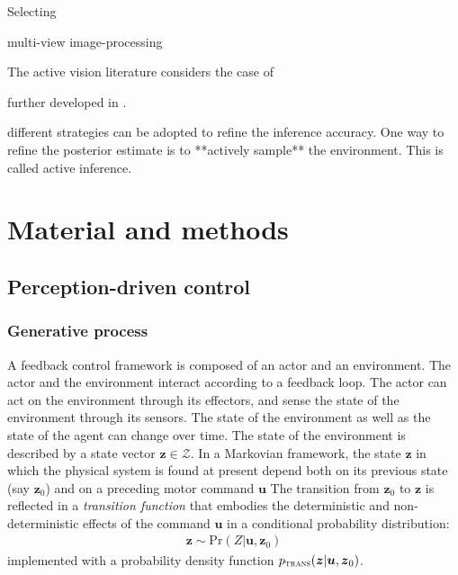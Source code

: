 \documentclass[12pt,twoside,openright]{article}
\begin{document}
Selecting 

multi-view image-processing

The active vision literature considers the case of 




further developed in \cite{najemnik2005optimal,butko2010infomax,ahmad2013active,potthast2016active}.



{ different strategies can be adopted to refine the inference accuracy. One way to refine the posterior estimate is to **actively sample** the environment. This is called active inference.} 



\section{Material and methods}

\subsection{Perception-driven control}

\subsubsection{Generative process}
A feedback control framework is composed of an actor and an environment. The actor and the environment interact according to a feedback loop. 
The actor can act on the environment through its effectors, and sense the state of the environment through its sensors. 
The state of the environment as well as the state of the agent can change over time. The state of the environment is described by a state vector $\boldsymbol{z} \in \mathcal{Z}$.
In a Markovian framework, the state $\boldsymbol{z}$ in which the physical system is found at present depend both on its previous state (say $\boldsymbol{z}_0$) and on a preceding motor command $\boldsymbol{u}$ 
The transition from $\boldsymbol{z}_0$ to $\boldsymbol{z}$ is reflected in a \emph{transition function} that embodies the deterministic and non-deterministic effects of the command $\boldsymbol{u}$ in a conditional probability distribution:  
\begin{align}
\boldsymbol{z} \sim \text{Pr}(Z|\boldsymbol{u},\boldsymbol{z}_0) \label{eq:process}
\end{align}
implemented with a probability density function 
$p_\text{\sc trans}(\boldsymbol{z}|\boldsymbol{u},\boldsymbol{z}_0)$.
\end{document}
